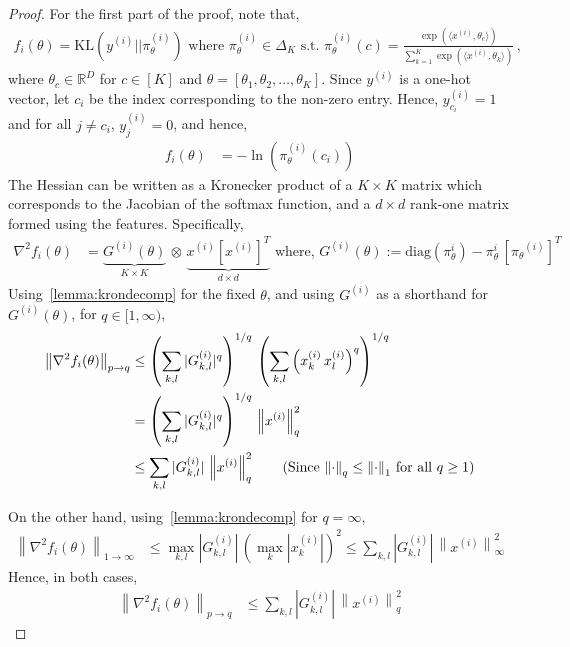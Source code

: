 \documentclass{article}
\newcommand{\normsq}[1]{\left\|#1 \right\|^{2}}
\newcommand{\norm}[1]{\left\|#1 \right\|}
\newcommand{\R}{\mathbb{R}}
\begin{document}
\begin{proof}
For the first part of the proof, note that, 
\begin{align*}
f_i(\theta) = \text{KL}(y^{(i)} || \pi^{(i)}_\theta) \text{ where $\pi^{(i)}_\theta \in \Delta_{K}$ s.t. } \pi^{(i)}_\theta(c) = \frac{\exp(\langle x^{(i)}, \theta_c \rangle)}{\sum_{k = 1}^{K} \exp(\langle x^{(i)}, \theta_k \rangle)} \,,
\end{align*}
where $\theta_c \in \R^D$ for $c \in [K]$ and $\theta = [\theta_1, \theta_2, \ldots, \theta_K]$. Since $y^{(i)}$ is a one-hot vector, let $c_{i}$ be the index corresponding to the non-zero entry. Hence, $y^{(i)}_{c_{i}} = 1$ and for all $j \neq c_{i}$, $y^{(i)}_{j} = 0$, and hence, 
\begin{align*}
f_i(\theta) &= -\ln\left(\pi_\theta^{(i)}(c_{i})\right)    
\end{align*}
The Hessian can be written as a Kronecker product of a $K \times K$ matrix which corresponds to the Jacobian of the softmax function, and a $d \times d$ rank-one matrix formed using the features. Specifically, 
\begin{align}
\nabla^2 f_i(\theta) &= \underbrace{G^{(i)}(\theta)}_{K \times K} \,\otimes\, \underbrace{x^{(i)} [x^{(i)}]^{T}}_{d \times d} \text{ where, } G^{(i)}(\theta) := \text{diag}(\pi^i_\theta) - \pi^i_\theta \, [\pi_\theta{^{(i)}}]^T 
\end{align}
Using~\cref{lemma:krondecomp} for the fixed $\theta$, and using $G^{(i)}$ as a shorthand for $G^{(i)}(\theta)$, for $q \in [1,\infty)$, 
\begin{align*}
\norm{\nabla^2 f_i(\theta)}_{p \to q} & \leq \left(\sum_{k,l} |G^{(i)}_{k,l}|^{q} \right)^{1/q}  \, \left(\sum_{k,l} \left(x^{(i)}_{k} \, x^{(i)}_{l}\right)^{q} \right)^{1/q} \\  
& = \left(\sum_{k,l} |G^{(i)}_{k,l}|^{q} \right)^{1/q} \, \normsq{x^{(i)}}_{q} \\
& \leq \sum_{k,l} |G^{(i)}_{k,l}| \, \normsq{x^{(i)}}_{q} \tag{Since $\norm{\cdot}_{q} \leq \norm{\cdot}_1$ for all $q \geq 1$}
\end{align*}

On the other hand, using~\cref{lemma:krondecomp} for $q = \infty$, 
\begin{align*}
\norm{\nabla^2 f_i(\theta)}_{1 \to \infty} & \leq  \max_{k,l}| G^{(i)}_{k,l} | \, (\max_{k} | x^{(i)}_k |)^{2} \leq \sum_{k,l} |G^{(i)}_{k,l}| \, \normsq{x^{(i)}}_\infty \tag{Since $\max_i v_i \leq \sum_i v_i$}
\end{align*}
Hence, in both cases, 
\begin{align*}
\norm{\nabla^2 f_i(\theta)}_{p \to q} & \leq  \sum_{k,l} |G^{(i)}_{k,l}| \, \normsq{x^{(i)}}_q
\end{align*}


\end{proof}
\end{document}
